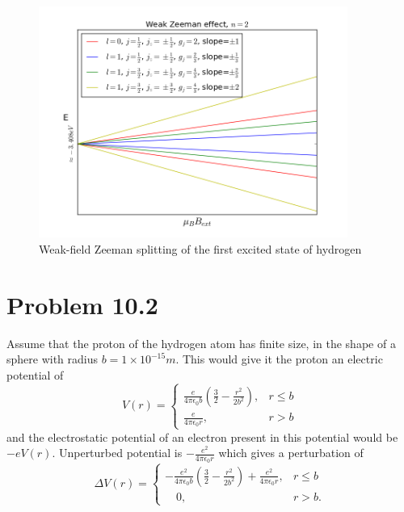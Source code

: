 \documentclass[11pt]{amsart}
\begin{document}
\begin{figure}
	\centering
	\includegraphics[width=0.9\textwidth]{figures/weakzeeman.png}
	\caption{Weak-field Zeeman splitting of the first excited state of hydrogen}
	\label{fig:weakzeemann2}
\end{figure}

\section*{Problem 10.2}

Assume that the proton of the hydrogen atom has finite size, in the shape of a sphere with radius $b=1\times10^{-15}m$. This would give it the proton an electric potential of
\begin{equation}
\label{eq:protonpotential}
V(r) = \begin{cases}
\frac{e}{4\pi\epsilon_0b}\left(\frac{3}{2} -\frac{r^2}{2b^2} \right), & r\leq b \\
\frac{e}{4\pi\epsilon_0r}, & r > b
\end{cases}
\end{equation}
and the electrostatic potential of an electron present in this potential would be $-eV(r)$. Unperturbed potential is $-\frac{e^2}{4\pi\epsilon_0r}$ which gives a perturbation of
\begin{equation}
\label{eq:perturbedhydrogenpot}
\Delta V(r) = \begin{cases}
-\frac{e^2}{4\pi\epsilon_0b}\left(\frac{3}{2}-\frac{r^2}{2b^2} \right) + \frac{e^2}{4\pi\epsilon_0r}, & r \leq b \\
\quad 0, & r > b.
\end{cases}
\end{equation}
\end{document}
